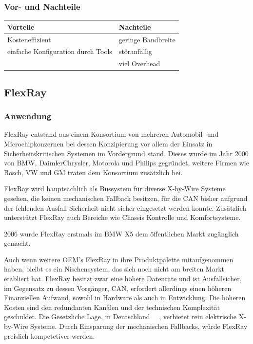     \subsubsection{Vor- und Nachteile}

    \begin{center}
        \begin{tabular}{l|l}
            \textbf{Vorteile} & \textbf{Nachteile}\\
            \hline Kosteneffizient & geringe Bandbreite\\
            \hline einfache Konfiguration durch Tools & störanfällig\\
            \hline & viel Overhead\\
            \hline
        \end{tabular}            
    \end{center}

\subsection{FlexRay}
    \subsubsection{Anwendung}
    FlexRay entstand aus einem Konsortium von mehreren Automobil- und Microchipkonzernen bei
    dessen Konzipierung vor allem der Einsatz in Sicherheitskritischen Systemen im Vordergrund 
    stand. Dieses wurde im Jahr 2000 von BMW, DaimlerChrysler, Motorola und Philips gegründet,
    weitere Firmen wie Bosch, VW und GM traten dem Konsortium zusätzlich bei.

    FlexRay wird hauptsächlich als Bussystem für diverse X-by-Wire Systeme gesehen, die keinen 
    mechanischen Fallback besitzen, für die CAN bisher aufgrund der fehlenden Ausfall Sicherheit 
    nicht sicher eingesetzt werden konnte. Zusätzlich unterstützt FlexRay auch Bereiche wie Chassis
    Kontrolle und Komfortsysteme. 

    2006 wurde FlexRay erstmals im BMW X5 dem öffentlichen Markt zugänglich gemacht.
    ~\cite{reif2011bosch}

    Auch wenn weitere OEM’s FlexRay in ihre Produktpalette mitaufgenommen haben, bleibt es
    ein Nischensystem, das sich noch nicht am breiten Markt etabliert hat. FlexRay besitzt zwar eine
    höhere Datenrate und ist Ausfallsicher, im Gegensatz zu dessen Vorgänger, CAN, erfordert 
    allerdings einen höheren Finanziellen Aufwand, sowohl in Hardware als auch in Entwicklung.
    Die höheren Kosten sind den redundanten Kanälen und der technischen Komplexität geschuldet.
    Die Gesetzliche Lage, in Deutschland~\cite{LA_StVZO38}~\cite{LA_StVZO41}
    , verbietet rein elektrische X-by-Wire Systeme. Durch 
    Einsparung der mechanischen Fallbacks, würde FlexRay preislich kompetetiver werden.
    ~\cite{LA_FR1}
    ~\cite{LA_FR3}
    
